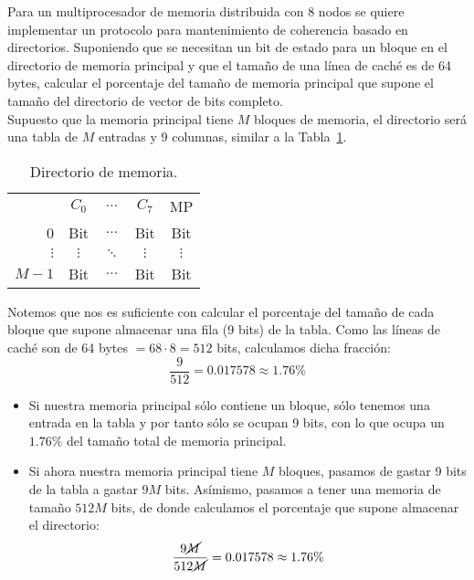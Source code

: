 \begin{ejercicio}
    Para un multiprocesador de memoria distribuida con $8$ nodos se quiere implementar un protocolo para mantenimiento de coherencia basado en directorios. Suponiendo que se necesitan un bit de estado para un bloque en el directorio de memoria principal y que el tamaño de una línea de caché es de 64 bytes, calcular el porcentaje del tamaño de memoria principal que supone el tamaño del directorio de vector de bits completo.\\

Supuesto que la memoria principal tiene $M$ bloques de memoria, el directorio será una tabla de $M$ entradas y 9 columnas, similar a la Tabla~\ref{tab:ej_rel3_2}.
\begin{table}[H]
\centering
\begin{tabular}{r|c|c|c|c|}
    & $C_0$ & $\ldots$ & $C_7$ & MP \\
    \cline{2-5}
    0 & Bit & $\ldots$ & Bit & Bit \\
    \cline{2-5}
    $\vdots$ & $\vdots$ & $\ddots$ & $\vdots$ & $\vdots$ \\
    \cline{2-5}
    $M-1$ & Bit & $\ldots$ & Bit & Bit \\
    \cline{2-5}
\end{tabular}
\caption{Directorio de memoria.}
\label{tab:ej_rel3_2}
\end{table}

Notemos que nos es suficiente con calcular el porcentaje del tamaño de cada bloque que supone almacenar una fila (9 bits) de la tabla. Como las líneas de caché son de 64 bytes $= 68\cdot 8 = 512$ bits, calculamos dicha fracción:
\begin{equation*}
    \dfrac{9}{512} = 0.017578 \approx 1.76\%
\end{equation*}
\begin{itemize}
    \item Si nuestra memoria principal sólo contiene un bloque, sólo tenemos una entrada en la tabla y por tanto sólo se ocupan 9 bits, con lo que ocupa un $1.76\%$ del tamaño total de memoria principal.
    \item Si ahora nuestra memoria principal tiene $M$ bloques, pasamos de gastar 9 bits de la tabla a gastar $9M$ bits. Asímismo, pasamos a tener una memoria de tamaño $512M$ bits, de donde calculamos el porcentaje que supone almacenar el directorio:
        \begin{equation*}
            \dfrac{9\cancel{M}}{512\cancel{M}} = 0.017578 \approx 1.76\%
        \end{equation*}
\end{itemize}

\end{ejercicio}


